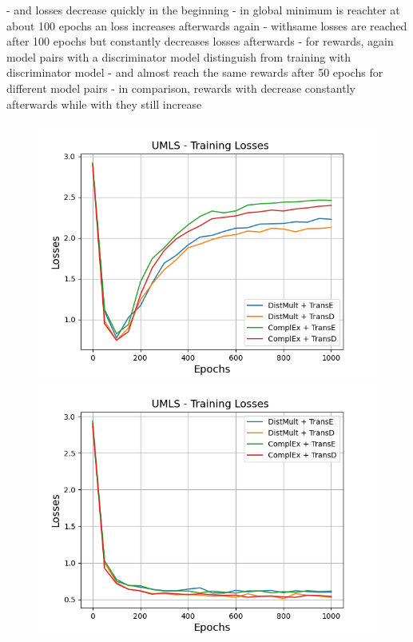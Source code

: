 - \origsampling and \ussoftmax losses decrease quickly in the beginning
- in \origsampling global minimum is reachter at about 100 epochs an loss increases afterwards again
- with\ussoftmax same losses are reached after 100 epochs but constantly decreases losses afterwards
- for rewards, again model pairs with a \transd discriminator model distinguish from training with \transe discriminator model
- \origsampling and \ussoftmax almost reach the same rewards after 50 epochs for different model pairs
- in comparison, rewards with \ussoftmax decrease constantly afterwards while with \origsampling they still increase


\begin{figure}
    \centering
    \begin{minipage}{.5\textwidth}
      \centering
      \includegraphics[width=0.9\linewidth]{figures/results/gan_train/not_pretrained/random/umls/random_umls_losses.png}
    \end{minipage}%
    \begin{minipage}{.5\textwidth}
      \centering
      \includegraphics[width=0.9\linewidth]{figures/results/gan_train/not_pretrained/uncertainty/max_distribution/entropy/umls/uncertainty_umls_losses.png}

\end{minipage}
\end{figure}
